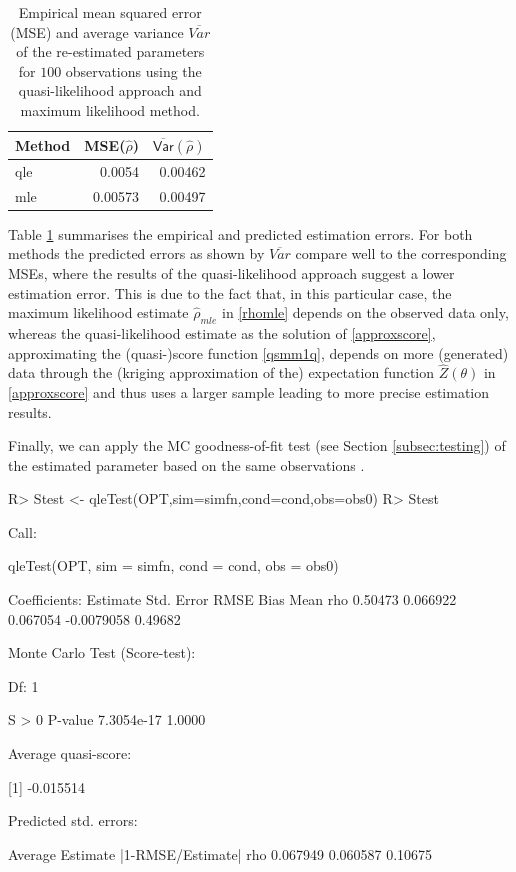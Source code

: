 \documentclass[article, nojss]{jss}
\numberwithin{equation}{section}			%
\begin{document}
\begin{table}[t!]
\centering
\begin{tabular}{l|rr}
Method & MSE($\hat{\rho}$) & $\overline{\mathsf{Var}}(\hat{\rho})$\\
\hline
qle & 0.0054 & 0.00462\\
mle & 0.00573 & 0.00497\\
\end{tabular}
\caption{Empirical mean squared error (MSE) and average variance
$\overline{Var}$ of the re-estimated parameters for $100$ observations using the quasi-likelihood 
approach and maximum likelihood method.}
\label{tab:err}
\end{table}
%
Table \ref{tab:err} summarises the empirical and predicted estimation
errors. For both methods the predicted errors as shown by $\overline{Var}$
compare well to the corresponding MSEs, where the results of the
quasi-likelihood approach suggest a lower estimation error. This is due to
the fact that, in this particular case, the maximum likelihood estimate
$\hat{\rho}_{mle}$ in \eqref{rhomle} depends on the observed data only, whereas
the quasi-likelihood estimate as the solution of \eqref{approxscore}, approximating the
(quasi-)score function \eqref{qsmm1q}, depends on more (generated) data through
the (kriging approximation of the) expectation function $\hat{Z}(\theta)$ in
\eqref{approxscore} and thus uses a larger sample leading to more precise
estimation results.\par
%
Finally, we can apply the MC goodness-of-fit test (see Section
\ref{subsec:testing}) of the estimated parameter based on the same observations
.
\begin{Schunk}
\begin{Sinput}
R> Stest <- qleTest(OPT,sim=simfn,cond=cond,obs=obs0)
R> Stest
\end{Sinput}
\begin{Soutput}
Call:

qleTest(OPT, sim = simfn, cond = cond, obs = obs0)

Coefficients:
     Estimate  Std. Error  RMSE      Bias        Mean   
rho  0.50473   0.066922    0.067054  -0.0079058  0.49682


Monte Carlo Test (Score-test):

  Df: 1 

     S > 0     P-value  
7.3054e-17      1.0000  


Average quasi-score: 

[1]  -0.015514


Predicted std. errors: 

     Average   Estimate  |1-RMSE/Estimate|
rho  0.067949  0.060587  0.10675          
\end{Soutput}
\end{Schunk}
\end{document}

